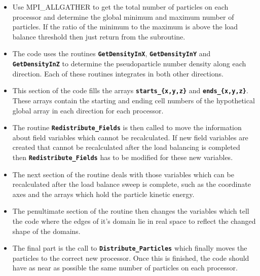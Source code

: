 \documentclass[12pt,a4paper]{article}
\newcommand{\inlinecode}[1]{{\color{warwickred} \bf\texttt{#1}}}
\begin{document}
\begin{itemize}
\item Use MPI\_ALLGATHER to get the total number of particles on each processor
  and determine the global minimum and maximum number of particles. If the
  ratio of the minimum to the maximum is above the load balance threshold then
  just return from the subroutine.
\item The code uses the routines \inlinecode{GetDensityInX},
  \inlinecode{GetDensityInY} and \inlinecode{GetDensityInZ} to determine the
  pseudoparticle number density along each direction. Each of these routines
  integrates in both other directions.
\item This section of the code fills the arrays \inlinecode{starts\_\{x,y,z\}}
  and \inlinecode{ends\_\{x,y,z\}}. These arrays contain the starting and
  ending cell numbers of the hypothetical global array in each direction for
  each processor.
\item The routine \inlinecode{Redistribute\_Fields} is then called to move the
  information about field variables which cannot be recalculated. If new field
  variables are created that cannot be recalculated after the load balancing is
  completed then \inlinecode{Redistribute\_Fields} has to be modified for these
  new variables.
\item The next section of the routine deals with those variables which can be
  recalculated after the load balance sweep is complete, such as the coordinate
  axes and the arrays which hold the particle kinetic energy.
\item The penultimate section of the routine then changes the variables which
  tell the code where the edges of it's domain lie in real space to reflect the
  changed shape of the domains.
\item The final part is the call to \inlinecode{Distribute\_Particles} which
  finally moves the particles to the correct new processor. Once this is
  finished, the code should have as near as possible the same number of
  particles on each processor.
\end{itemize}
\end{document}
